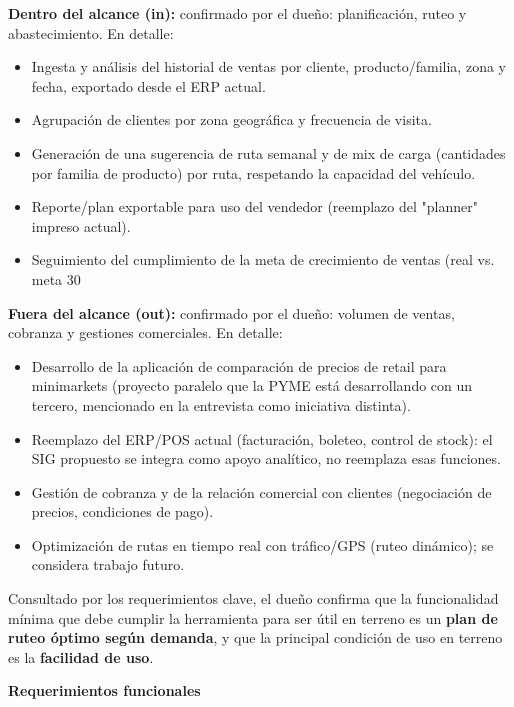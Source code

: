 \documentclass[10pt,a4paper]{article}
\begin{document}
\textbf{Dentro del alcance (in):} confirmado por el dueño: planificación, ruteo y abastecimiento. En detalle:
\begin{itemize}[leftmargin=1.2cm]
    \item Ingesta y análisis del historial de ventas por cliente, producto/familia, zona y fecha, exportado desde el ERP actual.
    \item Agrupación de clientes por zona geográfica y frecuencia de visita.
    \item Generación de una sugerencia de ruta semanal y de mix de carga (cantidades por familia de producto) por ruta, respetando la capacidad del vehículo.
    \item Reporte/plan exportable para uso del vendedor (reemplazo del "planner" impreso actual).
    \item Seguimiento del cumplimiento de la meta de crecimiento de ventas (real vs. meta 30%
\end{itemize}

\textbf{Fuera del alcance (out):} confirmado por el dueño: volumen de ventas, cobranza y gestiones comerciales. En detalle:
\begin{itemize}[leftmargin=1.2cm]
    \item Desarrollo de la aplicación de comparación de precios de retail para minimarkets (proyecto paralelo que la PYME está desarrollando con un tercero, mencionado en la entrevista como iniciativa distinta).
    \item Reemplazo del ERP/POS actual (facturación, boleteo, control de stock): el SIG propuesto se integra como apoyo analítico, no reemplaza esas funciones.
    \item Gestión de cobranza y de la relación comercial con clientes (negociación de precios, condiciones de pago).
    \item Optimización de rutas en tiempo real con tráfico/GPS (ruteo dinámico); se considera trabajo futuro.
\end{itemize}

Consultado por los requerimientos clave, el dueño confirma que la funcionalidad mínima que debe cumplir la herramienta para ser útil en terreno es un \textbf{plan de ruteo óptimo según demanda}, y que la principal condición de uso en terreno es la \textbf{facilidad de uso}.

\textbf{Requerimientos funcionales}
\end{document}
